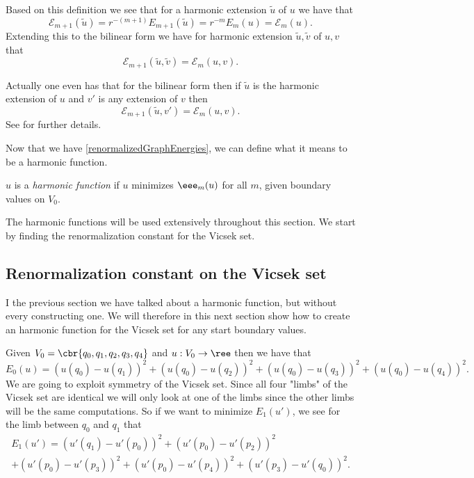 Based on this definition we see that for a harmonic extension $\tilde{u}$ of $u$ we have that 
\begin{equation}
	\mathcal{E}_{m+1}(\tilde{u}) = r^{-(m+1)}E_{m+1}(\tilde{u}) = r^{-m}E_{m}(u) = \mathcal{E}_{m}(u).
\end{equation}
Extending this to the bilinear form we have for harmonic extension $\tilde{u}, \tilde{v}$ of $u, v$ that
\begin{equation}
	\mathcal{E}_{m+1}(\tilde{u}, \tilde{v}) = \mathcal{E}_{m}(u,v).
\end{equation}

Actually one even has that for the bilinear form then if $\tilde{u}$ is the harmonic extension of $u$ and $v'$ is any extension of $v$ then
\begin{equation}\label{bilinearFormRenormalized}
	\mathcal{E}_{m+1}(\tilde{u}, v') = \mathcal{E}_{m}(u,v).
\end{equation}
See \cite{strichartz} for further details.

Now that we have \cref{renormalizedGraphEnergies}, we can define what it means to be a harmonic function.


\begin{defi}
	$u$ is a \emph{harmonic function} if $u$ minimizes $\eee_{m}(u)$ for all $m$, given boundary values on $V_0$.
\end{defi}

The harmonic functions will be used extensively throughout this section. We start by finding the renormalization constant for the Vicsek set.

\subsection{Renormalization constant on the Vicsek set}

I the previous section we have talked about a harmonic function, but without every constructing one. We will therefore in this next section show how to create an harmonic function for the Vicsek set for any start boundary values.

Given $V_0 = \cbr{q_0, q_1, q_2, q_3, q_4}$ and $u: V_0 \to \ree$ then we have that
\begin{equation}
	E_0(u) = \left(u(q_0) - u(q_1)\right)^2 + \left(u(q_0) - u(q_2)\right)^2 + \left(u(q_0) - u(q_3)\right)^2 + \left(u(q_0) - u(q_4)\right)^2.
\end{equation} 
We are going to exploit symmetry of the Vicsek set. Since all four "limbs" of the Vicsek set are identical we will only look at one of the limbs since the other limbs will be the same computations. So if we want to minimize $E_1(u')$, we see for the limb between $q_0$ and $q_1$ that
\begin{multline}
	E_1(u') = \left(u'(q_1) - u'(p_0)\right)^2 + \left(u'(p_0) - u'(p_2)\right)^2 \\
	 + \left(u'(p_0) - u'(p_3)\right)^2 + \left(u'(p_0) - u'(p_4)\right)^2 + \left(u'(p_3) - u'(q_0)\right)^2.
\end{multline}


